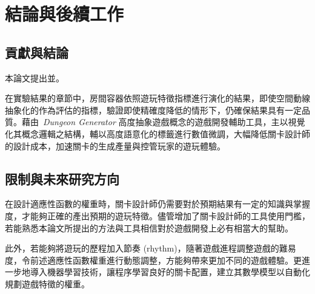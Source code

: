 \chapter{結論與後續工作}
\label{cha:conclusions}

\section{貢獻與結論}

本論文提出並。

在實驗結果的章節中，房間容器依照遊玩特徵指標進行演化的結果，即使空間動線抽象化的作為評估的指標，驗證即使精確度降低的情形下，仍確保結果具有一定品質。藉由~\textit{Dungeon Generator} 高度抽象遊戲概念的遊戲開發輔助工具，主以視覺化其概念邏輯之結構，輔以高度語意化的標籤進行數值微調，大幅降低關卡設計師的設計成本，加速關卡的生成產量與控管玩家的遊玩體驗。

\section{限制與未來研究方向} 

在設計適應性函數的權重時，關卡設計師仍需要對於預期結果有一定的知識與掌握度，才能夠正確的產出預期的遊玩特徵。儘管增加了關卡設計師的工具使用門檻，若能熟悉本論文所提出的方法與工具相信對於遊戲開發上必有相當大的幫助。

此外，若能夠將遊玩的歷程加入節奏 (rhythm)，隨著遊戲進程調整遊戲的難易度，令前述適應性函數權重進行動態調整，方能夠帶來更加不同的遊戲體驗。更進一步地導入機器學習技術，讓程序學習良好的關卡配置，建立其數學模型以自動化規劃遊戲特徵的權重。